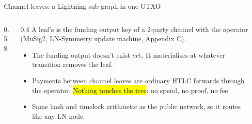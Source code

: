 \documentclass[aspectratio=169,10pt]{beamer}
\begin{document}
\begin{frame}{Channel leaves: a Lightning sub-graph in one UTXO}
  \begin{columns}[c]
    \begin{column}{0.58\textwidth}
    \end{column}
    \begin{column}{0.4\textwidth}
      \small
      A leaf's  is the funding output key of a 2-party channel with the operator (MuSig2, LN-Symmetry update machine, Appendix C).
      \begin{itemize}
        \item The funding output doesn't exist yet. It materialises at whatever transition removes the leaf.
        \item Payments between channel leaves are ordinary HTLC forwards through the operator. \hl{Nothing touches the tree}: no spend, no proof, no fee.
        \item Same hash and timelock arithmetic as the public network, so it routes like any LN node.
      \end{itemize}
    \end{column}
  \end{columns}
\end{frame}
\end{document}
